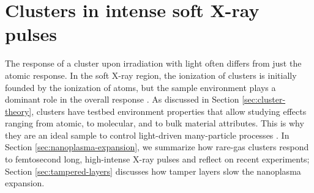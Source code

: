 \section{Clusters in intense soft X-ray pulses}\label{sec:ionizatin-of-ext-obj}
The response of a cluster upon irradiation with light often differs from just the atomic response. In the soft X-ray region, the ionization of clusters is initially founded by the ionization of atoms, but the sample environment plays a dominant role in the overall response \cite{Schorb-2012-PRL,Ferguson-2016-SciAdv}. As discussed in Section \ref{sec:cluster-theory}, clusters have testbed environment properties that allow studying effects ranging from atomic, to molecular, and to bulk material attributes. This is why they are an ideal sample to control light-driven many-particle processes \citep{Fennel-2010-RMP}. In Section \ref{sec:nanoplasma-expansion}, we summarize how rare-gas clusters respond to femtosecond long, high-intense X-ray pulses and reflect on recent experiments; Section \ref{sec:tampered-layers} discusses how tamper layers slow the nanoplasma expansion.
%
%
%
